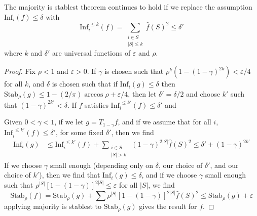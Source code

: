 \begin{theorem}
    The majority is stablest theorem continues to hold if we replace the assumption $\text{Inf}_i(f) \leq \delta$ with
    \[ \text{Inf}_i^{\ \leq k}(f) = \sum_{\substack{i \in S\\|S| \leq k}} \widehat{f}(S)^2 \leq \delta' \]
    where $k$ and $\delta'$ are universal functions of $\varepsilon$ and $\rho$.
\end{theorem}
\begin{proof}
    Fix $\rho < 1$ and $\varepsilon > 0$. If $\gamma$ is chosen such that $\rho^k(1 - (1 - \gamma)^{2k}) < \varepsilon/4$ for all $k$, and $\delta$ is chosen such that if $\text{Inf}_i(g) \leq \delta$ then $\text{Stab}_\rho(g) \leq 1 - (2/\pi) \arccos \rho + \varepsilon/4$, then let $\delta' = \delta/2$ and choose $k'$ such that $(1 - \gamma)^{2k'} < \delta$. If $f$ satisfies $\text{Inf}_i^{\ \leq k'}(f) \leq \delta'$ and

    Given $0 < \gamma < 1$, if we let $g = T_{1 - \gamma} f$, and if we assume that for all $i$, $\text{Inf}_i^{\ \leq k'}(f) \leq \delta'$, for some fixed $\delta'$, then we find
    \begin{align*}
        \text{Inf}_i(g) &\leq \text{Inf}_i^{\ \leq k'}(f) + \sum_{\substack{i \in S\\|S| > k'}} (1 - \gamma)^{2|S|} \widehat{f}(S)^2 \leq \delta' + (1 - \gamma)^{2k'}
    \end{align*}
    If we choose $\gamma$ small enough (depending only on $\delta$, our choice of $\delta'$, and our choice of $k'$), then we find that $\text{Inf}_i(g) \leq \delta$, and if we choose $\gamma$ small enough such that $\rho^{|S|} [1 - (1 - \gamma)]^{2|S|} \leq \varepsilon$ for all $|S|$, we find
    \[ \text{Stab}_\rho(f) = \text{Stab}_\rho(g) + \sum \rho^{|S|} [1 - (1 - \gamma)]^{2|S|} \widehat{f}(S)^2 \leq \text{Stab}_\rho(g) + \varepsilon \]
    applying majority is stablest to $\text{Stab}_\rho(g)$ gives the result for $f$.
\end{proof}

